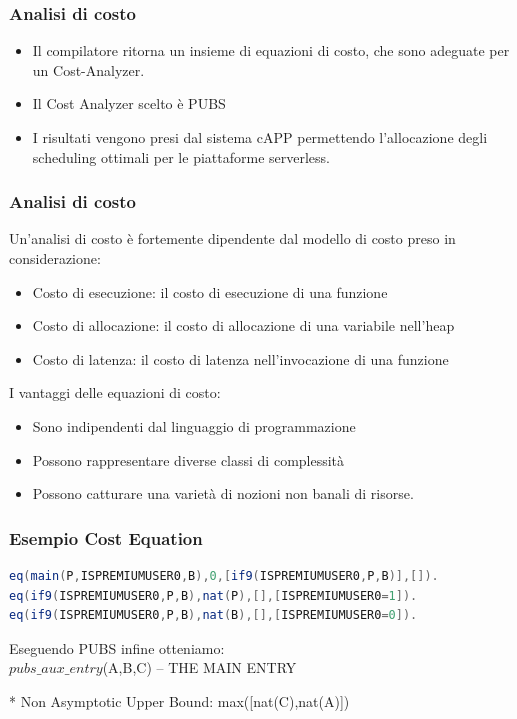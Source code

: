 \documentclass[xcolor=dvipsnames]{beamer}
\begin{document}
\begin{frame}
    \frametitle{Analisi di costo}
    \begin{itemize}
        \item Il compilatore ritorna un insieme di equazioni di costo, che sono adeguate per un Cost-Analyzer.
        \item Il Cost Analyzer scelto è PUBS
        \item I risultati vengono presi dal sistema cAPP permettendo l'allocazione degli scheduling ottimali per le piattaforme serverless.
    \end{itemize}
    
\end{frame}

\begin{frame}
    \frametitle{Analisi di costo}
    Un'analisi di costo è fortemente dipendente dal modello di costo preso in considerazione:
    \begin{itemize}
        \item \alert{Costo di esecuzione}: il costo di esecuzione di una funzione
        \item \alert{Costo di allocazione}: il costo di allocazione di una variabile nell'heap
        \item \alert{Costo di latenza}: il costo di latenza nell'invocazione di una funzione
    \end{itemize}
    I vantaggi delle equazioni di costo:
    \begin{itemize}
        \item Sono \alert{indipendenti} dal linguaggio di programmazione
        \item Possono rappresentare diverse classi di \alert{complessità}
        \item Possono catturare una varietà di nozioni non banali di risorse.
    \end{itemize}
\end{frame}
\begin{frame}[fragile]
    \frametitle{Esempio Cost Equation}
\begin{lstlisting}[language=Java, caption={Equazioni di costo per Listing 8}]
eq(main(P,ISPREMIUMUSER0,B),0,[if9(ISPREMIUMUSER0,P,B)],[]).
eq(if9(ISPREMIUMUSER0,P,B),nat(P),[],[ISPREMIUMUSER0=1]).
eq(if9(ISPREMIUMUSER0,P,B),nat(B),[],[ISPREMIUMUSER0=0]).
\end{lstlisting}
Eseguendo PUBS infine otteniamo:\\
\bigskip
$pubs\_aux\_entry$(A,B,C) -- THE MAIN ENTRY

  * Non Asymptotic Upper Bound: max([nat(C),nat(A)]) 
\end{frame}
\end{document}
